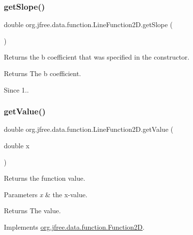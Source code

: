 \subsubsection{\texorpdfstring{get\+Slope()}{getSlope()}}
{\footnotesize\ttfamily double org.\+jfree.\+data.\+function.\+Line\+Function2\+D.\+get\+Slope (\begin{DoxyParamCaption}{ }\end{DoxyParamCaption})}

Returns the \textquotesingle{}b\textquotesingle{} coefficient that was specified in the constructor.

\begin{DoxyReturn}{Returns}
The \textquotesingle{}b\textquotesingle{} coefficient.
\end{DoxyReturn}
\begin{DoxySince}{Since}
1.. 
\end{DoxySince}
\mbox{\label{classorg_1_1jfree_1_1data_1_1function_1_1_line_function2_d_a964dd87401e1f11453022c5a95566657}} 
\subsubsection{\texorpdfstring{get\+Value()}{getValue()}}
{\footnotesize\ttfamily double org.\+jfree.\+data.\+function.\+Line\+Function2\+D.\+get\+Value (\begin{DoxyParamCaption}\item[{double}]{x }\end{DoxyParamCaption})}

Returns the function value.


\begin{DoxyParams}{Parameters}
{\em x} & the x-\/value.\\
\hline
\end{DoxyParams}
\begin{DoxyReturn}{Returns}
The value. 
\end{DoxyReturn}


Implements \mbox{\hyperlink{interfaceorg_1_1jfree_1_1data_1_1function_1_1_function2_d_a0f925a1dfe40f894d7f763f39320db22}{org.\+jfree.\+data.\+function.\+Function2D}}.

